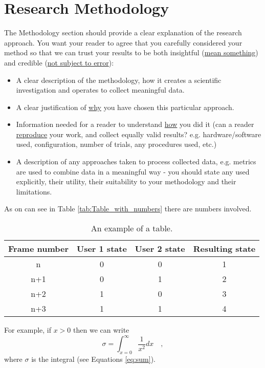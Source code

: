 
\chapter{Research Methodology}
\label{chap:Literature_Review}
The Methodology section should provide a clear explanation of the research approach.  You want your reader to agree that you carefully considered your method so that we can trust your results to be both insightful (\underline{mean something}) and credible (\underline{not subject to error}):
\begin{itemize}
    \item A clear description of the methodology, how it creates a scientific investigation and operates to collect meaningful data.
    \item A clear justification of \underline{why} you have chosen this particular approach.
    \item Information needed for a reader to understand \underline{how} you did it (can a reader \underline{reproduce} your work, and collect equally valid results? e.g. hardware/software used, configuration, number of trials, any procedures used, etc.)
    \item A description of any approaches taken to process collected data, e.g. metrics are used to combine data in a meaningful way - you should state any used explicitly, their utility, their suitability to your methodology and their limitations.  
\end{itemize}



As on can see in Table \ref{tab:Table_with_numbers} there are numbers involved. 

\begin{table}[h!]
\centering
 \begin{tabular}{|c | c | c | c|} 
 \hline
  Frame number & User 1 state & User 2 state & Resulting state \\ [0.5ex] 
 \hline
 \hline
  n & 0 & 0 & 1 \\ 
 \hline
  n+1 & 0 & 1 & 2\\
 \hline
  n+2 & 1 & 0 & 3 \\
 \hline
  n+3 & 1 & 1 & 4 \\
 \hline
\end{tabular}
\caption{\label{tab:Table_with_numbers}An example of a table.}
\label{table:example}
\end{table}

For example, if $x>0$ then we can write
\begin{equation}
\label{eq:sum}
\sigma =\int_{x=0}^{\infty} \frac{1}{x^2}dx \quad ,
\end{equation}
where $\sigma$ is the integral (see Equations \ref{eq:sum}).  


